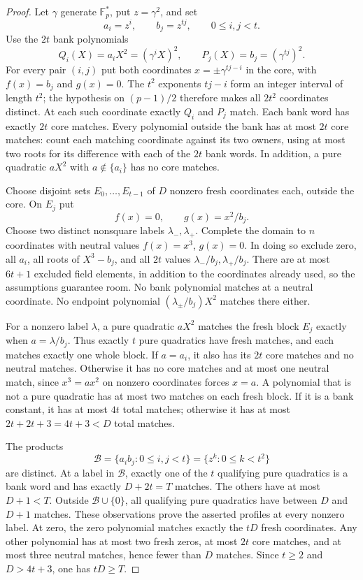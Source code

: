 \begin{proof}
Let $\gamma$ generate $\mathbb F_p^*$, put $z=\gamma^2$, and set
\[
 a_i=z^i,\qquad b_j=z^{tj},\qquad 0\le i,j<t.
\]
Use the $2t$ bank polynomials
\[
 Q_i(X)=a_iX^2=(\gamma^iX)^2,
 \qquad P_j(X)=b_j=(\gamma^{tj})^2.
\]
For every pair $(i,j)$ put both coordinates
$x=\pm\gamma^{tj-i}$ in the core, with $f(x)=b_j$ and $g(x)=0$.
The $t^2$ exponents $tj-i$ form an integer interval of length $t^2$;
the hypothesis on $(p-1)/2$ therefore makes all $2t^2$ coordinates
distinct.  At each such coordinate exactly $Q_i$ and $P_j$ match.
Each bank word has exactly $2t$ core matches.  Every polynomial
outside the bank has at most $2t$ core matches: count each matching
coordinate against its two owners, using at most two roots for its
difference with each of the $2t$ bank words.  In addition, a pure
quadratic $aX^2$ with $a\notin\{a_i\}$ has no core matches.

Choose disjoint sets $E_0,\ldots,E_{t-1}$ of $D$ nonzero fresh
coordinates each, outside the core.  On $E_j$ put
\[
 f(x)=0,\qquad g(x)=x^2/b_j.
\]
Choose two distinct nonsquare labels $\lambda_-,\lambda_+$.
Complete the domain to $n$ coordinates with neutral values
$f(x)=x^3$, $g(x)=0$.  In doing so exclude zero, all $a_i$, all
roots of $X^3-b_j$, and all $2t$ values
$\lambda_-/b_j,\lambda_+/b_j$.
There are at most $6t+1$ excluded field elements, in addition to
the coordinates already used, so the assumptions guarantee room.
No bank polynomial matches at a neutral coordinate.  No endpoint
polynomial $(\lambda_\pm/b_j)X^2$ matches there either.

For a nonzero label $\lambda$, a pure quadratic $aX^2$ matches
the fresh block $E_j$ exactly when $a=\lambda/b_j$.
Thus exactly $t$ pure quadratics have fresh matches, and each
matches exactly one whole block.  If $a=a_i$, it also has its
$2t$ core matches and no neutral matches.  Otherwise it has no
core matches and at most one neutral match, since $x^3=ax^2$
on nonzero coordinates forces $x=a$.
A polynomial that is not a pure quadratic has at most two matches
on each fresh block.  If it is a bank constant, it has at most
$4t$ total matches; otherwise it has at most
$2t+2t+3=4t+3<D$ total matches.

The products
\[
 \mathcal B=\{a_i b_j:0\le i,j<t\}
            =\{z^k:0\le k<t^2\}
\]
are distinct.  At a label in $\mathcal B$, exactly one of the
$t$ qualifying pure quadratics is a bank word and has exactly
$D+2t=T$ matches.  The others have at most $D+1<T$.
Outside $\mathcal B\cup\{0\}$, all qualifying pure quadratics
have between $D$ and $D+1$ matches.  These observations prove
the asserted profiles at every nonzero label.  At zero, the zero
polynomial matches exactly the $tD$ fresh coordinates.  Any other
polynomial has at most two fresh zeros, at most $2t$ core matches,
and at most three neutral matches, hence fewer than $D$ matches.
Since $t\ge2$ and $D>4t+3$, one has $tD\ge T$.


\end{proof}
